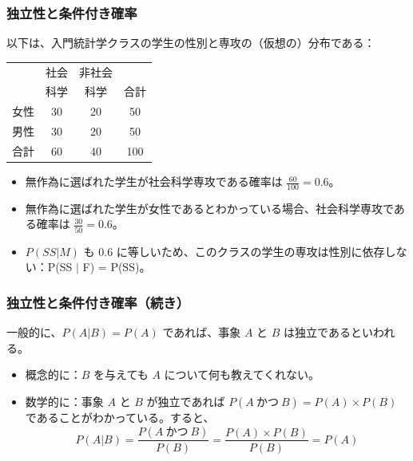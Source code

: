 \begin{frame}[shrink=10]
\frametitle{独立性と条件付き確率}

以下は、入門統計学クラスの学生の性別と専攻の（仮想の）分布である：

{\small
\begin{center}
\begin{tabular}{l | c c | c}
			& 社会	& 非社会 		&  \\
			& 科学	& 科学	& 合計 \\
\hline
女性		& 30		& 20		& 50 \\
男性			& 30		& 20		& 50 \\
\hline
合計			& 60		& 40		& 100
\end{tabular}
\end{center}
}

\begin{itemize}

\item 無作為に選ばれた学生が社会科学専攻である確率は $\frac{60}{100} = 0.6$。

\item 無作為に選ばれた学生が女性であるとわかっている場合、社会科学専攻である確率は $\frac{30}{50} = 0.6$。

\item $P(SS | M)$ も 0.6 に等しいため、このクラスの学生の専攻は性別に依存しない：P(SS $|$ F) = P(SS)。

\end{itemize}

\end{frame}


\begin{frame}
\frametitle{独立性と条件付き確率（続き）}

一般的に、$P(A|B) = P(A)$ であれば、事象 $A$ と $B$ は独立であるといわれる。

\begin{itemize}

\item 概念的に：$B$ を与えても $A$ について何も教えてくれない。

\item 数学的に：事象 $A$ と $B$ が独立であれば $P(A~\text{かつ}~B) = P(A) \times P(B)$ であることがわかっている。すると、
\[ P(A|B) = \frac{P(A~\text{かつ}~B)}{P(B)} = \frac{P(A) \times P(B)}{P(B)} = P(A) \]

\end{itemize}

\end{frame}


